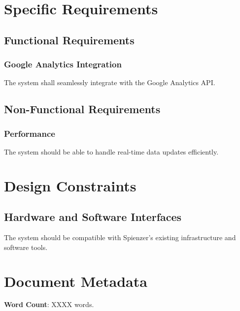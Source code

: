 \documentclass[12pt]{article}
\begin{document}
\section{Specific Requirements}
\subsection{Functional Requirements}
\subsubsection{Google Analytics Integration}
The system shall seamlessly integrate with the Google Analytics API.

\subsection{Non-Functional Requirements}
\subsubsection{Performance}
The system should be able to handle real-time data updates efficiently.

\section{Design Constraints}
\subsection{Hardware and Software Interfaces}
The system should be compatible with Spienzer's existing infrastructure and software tools.
\newpage %
\section*{Document Metadata}
\textbf{Word Count}: XXXX words.
\end{document}
